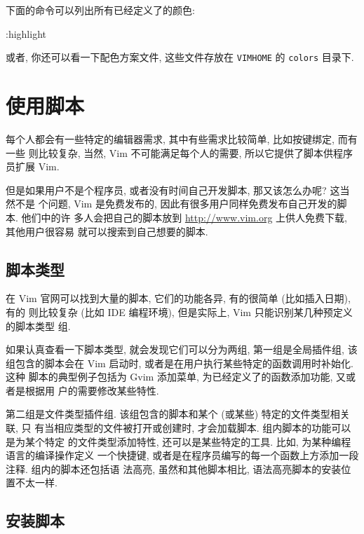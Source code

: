下面的命令可以列出所有已经定义了的颜色:
\begin{vimcode}
:highlight
\end{vimcode}

\begin{warning}
    或者, 你还可以看一下配色方案文件, 这些文件存放在 \texttt{VIMHOME} 的
    \texttt{colors} 目录下.
\end{warning}

\section{使用脚本}
\label{sec:using_scripts}

每个人都会有一些特定的编辑器需求, 其中有些需求比较简单, 比如按键绑定, 而有一些
则比较复杂, 当然, Vim 不可能满足每个人的需要, 所以它提供了脚本供程序员扩展
Vim.

但是如果用户不是个程序员, 或者没有时间自己开发脚本, 那又该怎么办呢? 这当然不是
个问题, Vim 是免费发布的, 因此有很多用户同样免费发布自己开发的脚本. 他们中的许
多人会把自己的脚本放到 \url{http://www.vim.org} 上供人免费下载, 其他用户很容易
就可以搜索到自己想要的脚本.

\subsection{脚本类型}
\label{subsec:script_types}

在 Vim 官网可以找到大量的脚本, 它们的功能各异, 有的很简单 (比如插入日期), 有的
则比较复杂 (比如 IDE 编程环境), 但是实际上, Vim 只能识别某几种预定义的脚本类型
组.

如果认真查看一下脚本类型, 就会发现它们可以分为两组, 第一组是全局插件组, 该
组包含的脚本会在 Vim 启动时, 或者是在用户执行某些特定的函数调用时补始化. 这种
脚本的典型例子包括为 Gvim 添加菜单, 为已经定义了的函数添加功能, 又或者是根据用
户的需要修改某些特性.

第二组是文件类型插件组. 该组包含的脚本和某个 (或某些) 特定的文件类型相关联, 只
有当相应类型的文件被打开或创建时, 才会加载脚本. 组内脚本的功能可以是为某个特定
的文件类型添加特性, 还可以是某些特定的工具. 比如, 为某种编程语言的编译操作定义
一个快捷键, 或者是在程序员编写的每一个函数上方添加一段注释. 组内的脚本还包括语
法高亮, 虽然和其他脚本相比, 语法高亮脚本的安装位置不太一样.

\subsection{安装脚本}
\label{subsec:installing_scripts}

